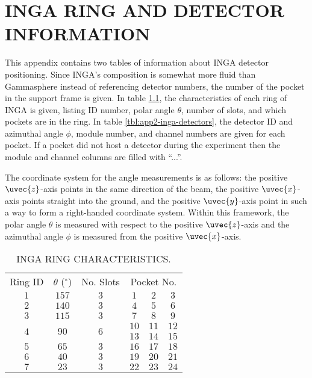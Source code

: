 %
%

\chapter{INGA RING AND DETECTOR INFORMATION}
\label{app:inga-rings-and-detectors}
This appendix contains two tables of information about INGA detector positioning. Since INGA's composition is somewhat more fluid than Gammasphere instead of referencing detector numbers, the number of the pocket in the support frame is given. In table \ref{tbl:app2-inga-rings}, the characteristics of each ring of INGA is given, listing ID number, polar angle $\theta$, number of slots, and which pockets are in the ring.  In table \ref{tbl:app2-inga-detectors}, the detector ID and azimuthal angle $\phi$, module number, and channel numbers are given for each pocket. If a pocket did not host a detector during the experiment then the module and channel columns are filled with ``...''.

The coordinate system for the angle measurements is as follows: the positive $\uvec{z}$-axis points in the same direction of the beam, the positive $\uvec{x}$-axis points straight into the ground, and the positive $\uvec{y}$-axis point in such a way to form a right-handed coordinate system. Within this framework, the polar angle $\theta$ is measured with respect to the positive $\uvec{z}$-axis and the azimuthal angle $\phi$ is measured from the positive $\uvec{x}$-axis.

\begin{table}
\caption{INGA RING CHARACTERISTICS.\label{tbl:app2-inga-rings}}
\begin{center}
\begin{tabular}{|c|c|c|c|c|c|}
\toprule
Ring ID & $\theta$ ($^{\circ}$) & No. Slots&\multicolumn{3}{|c|}{Pocket No.}\\ 
$1$&$157$&$3$&$1$&$2$&$3$\\
$2$&$140$&$3$&$4$&$5$&$6$\\
$3$&$115$&$3$&$7$&$8$&$9$\\
\multirow{2}{*}{$4$}&\multirow{2}{*}{$90$}&\multirow{2}{*}{$6$}&$10$&$11$&$12$\\
&&&$13$&$14$&$15$\\
$5$&$65$&$3$&$16$&$17$&$18$\\
$6$&$40$&$3$&$19$&$20$&$21$\\
$7$&$23$&$3$&$22$&$23$&$24$\\
\bottomrule
\end{tabular}
\end{center}
\end{table}

